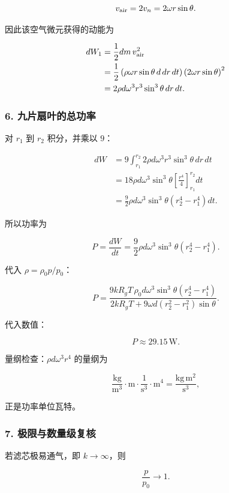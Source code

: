\documentclass[12pt,a4paper,UTF8]{ctexart}
\begin{document}
\[
v_{\rm air}=2v_n=2\omega r\sin\theta.
\]

因此该空气微元获得的动能为

\[
\begin{aligned}
dW_1
&=\frac12dm\,v_{\rm air}^2\\
&=\frac12\left(\rho\omega r\sin\theta\,d\,dr\,dt\right)
\left(2\omega r\sin\theta\right)^2\\
&=2\rho d\omega^3r^3\sin^3\theta\,dr\,dt.
\end{aligned}
\]

\subsubsection{6.
九片扇叶的总功率}\label{ux4e5dux7247ux6247ux53f6ux7684ux603bux529fux7387}

对 \(r_1\) 到 \(r_2\) 积分，并乘以 \(9\)：

\[
\begin{aligned}
dW
&=9\int_{r_1}^{r_2}
2\rho d\omega^3r^3\sin^3\theta\,dr\,dt\\
&=18\rho d\omega^3\sin^3\theta
\left[\frac{r^4}{4}\right]_{r_1}^{r_2}dt\\
&=\frac92\rho d\omega^3\sin^3\theta
(r_2^4-r_1^4)dt.
\end{aligned}
\]

所以功率为

\[
P=\frac{dW}{dt}
=\frac92\rho d\omega^3\sin^3\theta(r_2^4-r_1^4).
\]

代入 \(\rho=\rho_0p/p_0\)：

\[
\boxed{
P=
\frac{9kR_gT\,\rho_0d\omega^3\sin^3\theta(r_2^4-r_1^4)}
{2kR_gT+9\omega d(r_2^2-r_1^2)\sin\theta}
}.
\]

代入数值：

\[
\boxed{P\approx29.15\,\mathrm W}.
\]

量纲检查：\(\rho d\omega^3r^4\) 的量纲为

\[
\frac{\mathrm{kg}}{\mathrm{m^3}}\cdot\mathrm m
\cdot\frac{1}{\mathrm{s^3}}\cdot\mathrm{m^4}
=\frac{\mathrm{kg\,m^2}}{\mathrm{s^3}},
\]

正是功率单位瓦特。

\subsubsection{7.
极限与数量级复核}\label{ux6781ux9650ux4e0eux6570ux91cfux7ea7ux590dux6838}

若滤芯极易通气，即 \(k\to\infty\)，则

\[
\frac{p}{p_0}\to1.
\]
\end{document}
